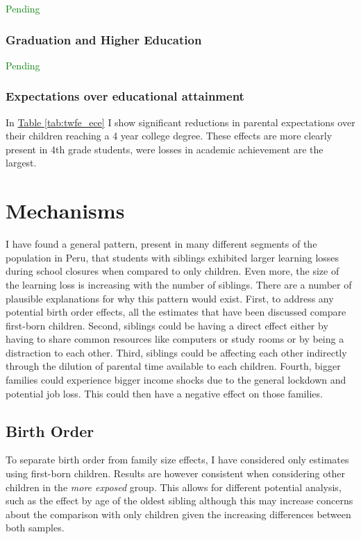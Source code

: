 \textcolor{green}{Pending}

\subsubsection{Graduation and Higher Education}

\textcolor{green}{Pending}

\subsubsection{Expectations over educational attainment}

In \hyperref[tab:twfe_ece]{Table \ref{tab:twfe_ece}}
I show significant reductions in parental expectations over their children reaching a 4 year college degree. These effects are more clearly present in 4th grade students, were losses in academic achievement are the largest.

\section{Mechanisms}\label{sec:mechanisms}

I have found a general pattern, present in many different segments of the population in Peru, that students with siblings exhibited larger learning losses during school closures when compared to only children. Even more, the size of the learning loss is increasing with the number of siblings. There are a number of plausible explanations for why this pattern would exist. First, to address any potential birth order effects, all the estimates that have been discussed compare first-born children. Second, siblings could be having a direct effect either by having to share common resources like computers or study rooms or by being a distraction to each other. Third, siblings could be affecting each other indirectly through the dilution of parental time available to each children. Fourth, bigger families could experience bigger income shocks due to the general lockdown and potential job loss. This could then have a negative effect on those families.


\subsection{Birth Order}

To separate birth order from family size effects, I have considered only estimates using first-born children. Results are however consistent when considering other children in the \textit{more exposed} group. This allows for different potential analysis, such as the effect by age of the oldest sibling although this may increase concerns about the comparison with only children given the increasing differences between both samples.

